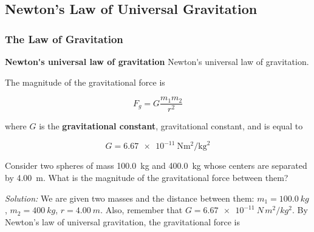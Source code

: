 \documentclass[dvipsnames]{article}
\newif\ifShowUnitV                               %
\begin{document}
\ifShowUnitV
\setcounter{example}{0}

\subsection{Newton's Law of Universal Gravitation}

\subsubsection{The Law of Gravitation}

\textbf{\gls{Newton's universal law of gravitation}} \glsdesc{Newton's universal law of gravitation}.

\begin{center}
\end{center}

The magnitude of the gravitational force is

\begin{equation*}
    F_g  = G\frac{m_1 m_2}{r^2}
\end{equation*}

where $G$ is the \textbf{\gls{gravitational constant}}, \glsdesc{gravitational constant}, and is equal to

\begin{equation*}
    G = \SI[per-mode=fraction]{6.67e-11}{\newton\meter\tothe{2}\per\kilogram\tothe{2}}
\end{equation*}

\begin{example}
Consider two spheres of mass \SI{100.0}{kg} and \SI{400.0}{kg} whose centers are separated by \SI{4.00}{m}. What is the magnitude of the gravitational force between them?
\end{example}

\textit{Solution:}
We are given two masses and the distance between them: $m_1 = \SI{100.0}{kg}$, $m_2 = \SI{400}{kg}$, $r = \SI{4.00}{m}$. Also, remember that $G = \SI{6.67e-11}{N\,m^2/kg^2}$. By Newton's law of universal gravitation, the gravitational force is
\end{document}
